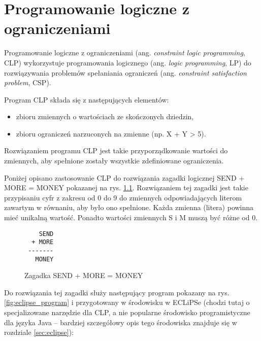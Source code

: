 \chapter{Programowanie logiczne z ograniczeniami}


Programowanie logiczne z ograniczeniami (ang. \textit{constraint logic programming}, CLP)\cite{CLP} wykorzystuje programowania logicznego (ang. \textit{logic programming}, LP) do rozwiązywania problemów spełaniania ograniczeń (ang. \textit{constraint satisfaction problem}, CSP). 

Program CLP składa się z następujących elementów:
\begin{itemize}
\item{zbioru zmiennych o wartościach ze skończonych dziedzin,}
\item{zbioru ograniczeń narzuconych na zmienne (np. X + Y > 5).}
\end{itemize}

Rozwiązaniem programu CLP jest takie przyporządkowanie wartości do zmiennych, aby spełnione zostały wszystkie zdefiniowane ograniczenia.

Poniżej opisano zastosowanie CLP do rozwiązania zagadki logicznej SEND + MORE  = MONEY \cite{Eclipse} pokazanej na rys. \ref{fig:sendmoremoney}. Rozwiązaniem tej zagadki jest takie przypisaniu cyfr z zakresu od 0 do 9 do zmiennych odpowiadających literom zawartym w równaniu, aby było ono spełnione. Każda zmienna (litera) powinna mieć unikalną wartość. Ponadto wartości zmiennych S i M muszą być różne od 0.

\begin{figure}
\begin{center}
\begin{verbatim}
    SEND
  + MORE
 -------
   MONEY
\end{verbatim}
\end{center}
\caption{Zagadka SEND + MORE = MONEY}
\label{fig:sendmoremoney}
\end{figure}

Do rozwiązania tej zagadki służy następujący program pokazany na rys. \ref{fig:eclipse_program} i przygotowany w środowisku w ECLiPSe (chodzi tutaj o specjalizowane narzędzie dla CLP, a nie popularne środowisko programistyczne dla języka Java -- bardziej szczegółowy opis tego środowiska znajduje się w rozdziale \ref{sec:eclipse}):

